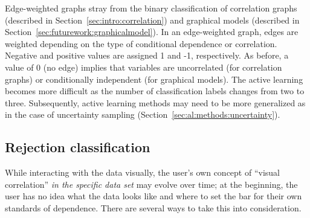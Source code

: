Edge-weighted graphs stray from the binary classification of 
correlation graphs (described in Section~\ref{sec:intro:correlation}) and 
graphical models (described in Section~\ref{sec:futurework:graphicalmodel}). In 
an edge-weighted graph, edges are weighted depending
on the type of conditional dependence or correlation. Negative and positive 
values are assigned 1 and -1, respectively. As before, a value of 0 (no edge) 
implies that variables are uncorrelated (for correlation graphs) or 
conditionally independent (for graphical models). The active learning becomes 
more difficult as the number of classification labels changes from two to 
three. Subsequently, active learning methods may need to be more generalized as 
in the case of uncertainty sampling (Section~\ref{sec:al:methods:uncertainty}). 

\subsection{Rejection classification}
\label{sec:futurework:rejection}

While interacting with the data visually, the user's own concept of ``visual 
correlation'' \textit{in the specific data set} may evolve over time; at the 
beginning, the user has no idea what the data looks like and where to set the 
bar for their own standards of dependence. There are several 
ways to take this into consideration. 

